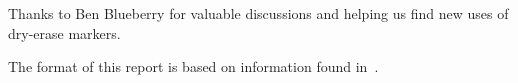     Thanks to Ben Blueberry for valuable discussions and helping
    us find new uses of dry-erase markers.

    The format of this report is based on information found
    in~\cite{Sand98-0730}.
